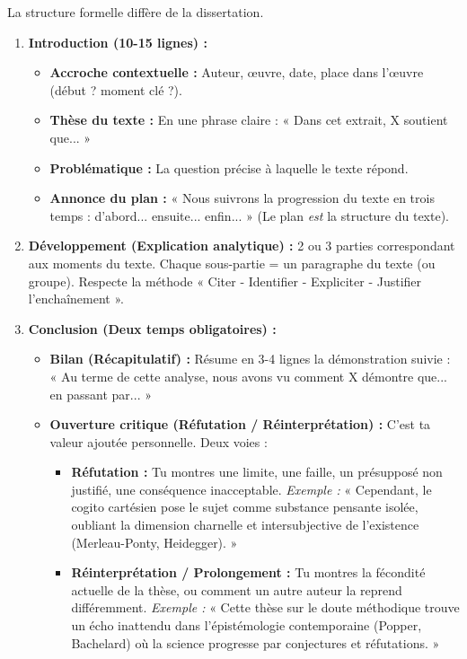\documentclass[11pt]{article}
\begin{document}
La structure formelle diffère de la dissertation.

\begin{methode}
\begin{enumerate}
    \item \textbf{Introduction (10-15 lignes) :}
    \begin{itemize}
        \item \textbf{Accroche contextuelle :} Auteur, œuvre, date, place dans l'œuvre (début ? moment clé ?).
        \item \textbf{Thèse du texte :} En une phrase claire : « Dans cet extrait, X soutient que... »
        \item \textbf{Problématique :} La question précise à laquelle le texte répond.
        \item \textbf{Annonce du plan :} « Nous suivrons la progression du texte en trois temps : d'abord... ensuite... enfin... » (Le plan \emph{est} la structure du texte).
    \end{itemize}
    \item \textbf{Développement (Explication analytique) :} 2 ou 3 parties correspondant aux moments du texte. Chaque sous-partie = un paragraphe du texte (ou groupe). Respecte la méthode « Citer - Identifier - Expliciter - Justifier l'enchaînement ».
    \item \textbf{Conclusion (Deux temps obligatoires) :}
    \begin{itemize}
        \item \textbf{Bilan (Récapitulatif) :} Résume en 3-4 lignes la démonstration suivie : « Au terme de cette analyse, nous avons vu comment X démontre que... en passant par... »
        \item \textbf{Ouverture critique (Réfutation / Réinterprétation) :} C'est ta valeur ajoutée personnelle. Deux voies :
        \begin{itemize}
            \item \textbf{Réfutation :} Tu montres une limite, une faille, un présupposé non justifié, une conséquence inacceptable. \emph{Exemple :} « Cependant, le cogito cartésien pose le sujet comme substance pensante isolée, oubliant la dimension charnelle et intersubjective de l'existence (Merleau-Ponty, Heidegger). »
            \item \textbf{Réinterprétation / Prolongement :} Tu montres la fécondité actuelle de la thèse, ou comment un autre auteur la reprend différemment. \emph{Exemple :} « Cette thèse sur le doute méthodique trouve un écho inattendu dans l'épistémologie contemporaine (Popper, Bachelard) où la science progresse par conjectures et réfutations. »
        \end{itemize}
    \end{itemize}
\end{enumerate}
\end{methode}
\end{document}
